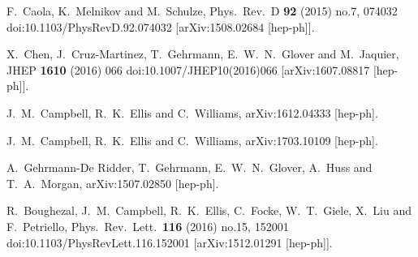   F.~Caola, K.~Melnikov and M.~Schulze,
  Phys.\ Rev.\ D {\bf 92} (2015) no.7,  074032
  doi:10.1103/PhysRevD.92.074032
  [arXiv:1508.02684 [hep-ph]].

  X.~Chen, J.~Cruz-Martinez, T.~Gehrmann, E.~W.~N.~Glover and M.~Jaquier,
  JHEP {\bf 1610} (2016) 066
  doi:10.1007/JHEP10(2016)066
  [arXiv:1607.08817 [hep-ph]].



  J.~M.~Campbell, R.~K.~Ellis and C.~Williams,
  arXiv:1612.04333 [hep-ph].


  J.~M.~Campbell, R.~K.~Ellis and C.~Williams,
  arXiv:1703.10109 [hep-ph].


  A.~Gehrmann-De Ridder, T.~Gehrmann, E.~W.~N.~Glover, A.~Huss and T.~A.~Morgan,
  arXiv:1507.02850 [hep-ph].

  R.~Boughezal, J.~M.~Campbell, R.~K.~Ellis, C.~Focke, W.~T.~Giele, X.~Liu and F.~Petriello,
  Phys.\ Rev.\ Lett.\  {\bf 116} (2016) no.15,  152001
  doi:10.1103/PhysRevLett.116.152001
  [arXiv:1512.01291 [hep-ph]].


